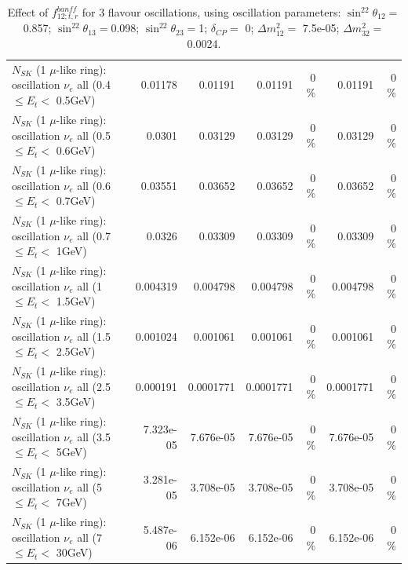 \begin{table}
\begin{tabular}{| l | r | r | r  r | r  r |}
$N_{SK}$ (1 $\mu$-like ring): oscillation $\nu_{e}$ all (0.4 $\leq E_{t} <$ 0.5GeV) &         0.01178 &         0.01191 &         0.01191 &        0 \%  &         0.01191 &        0 \%  \\ 
$N_{SK}$ (1 $\mu$-like ring): oscillation $\nu_{e}$ all (0.5 $\leq E_{t} <$ 0.6GeV) &          0.0301 &         0.03129 &         0.03129 &        0 \%  &         0.03129 &        0 \%  \\ 
$N_{SK}$ (1 $\mu$-like ring): oscillation $\nu_{e}$ all (0.6 $\leq E_{t} <$ 0.7GeV) &         0.03551 &         0.03652 &         0.03652 &        0 \%  &         0.03652 &        0 \%  \\ 
$N_{SK}$ (1 $\mu$-like ring): oscillation $\nu_{e}$ all (0.7 $\leq E_{t} <$ 1GeV) &          0.0326 &         0.03309 &         0.03309 &        0 \%  &         0.03309 &        0 \%  \\ 
$N_{SK}$ (1 $\mu$-like ring): oscillation $\nu_{e}$ all (1 $\leq E_{t} <$ 1.5GeV) &        0.004319 &        0.004798 &        0.004798 &        0 \%  &        0.004798 &        0 \%  \\ 
$N_{SK}$ (1 $\mu$-like ring): oscillation $\nu_{e}$ all (1.5 $\leq E_{t} <$ 2.5GeV) &        0.001024 &        0.001061 &        0.001061 &        0 \%  &        0.001061 &        0 \%  \\ 
$N_{SK}$ (1 $\mu$-like ring): oscillation $\nu_{e}$ all (2.5 $\leq E_{t} <$ 3.5GeV) &        0.000191 &       0.0001771 &       0.0001771 &        0 \%  &       0.0001771 &        0 \%  \\ 
$N_{SK}$ (1 $\mu$-like ring): oscillation $\nu_{e}$ all (3.5 $\leq E_{t} <$ 5GeV) &       7.323e-05 &       7.676e-05 &       7.676e-05 &        0 \%  &       7.676e-05 &        0 \%  \\ 
 $N_{SK}$ (1 $\mu$-like ring): oscillation $\nu_{e}$ all (5 $\leq E_{t} <$ 7GeV) &       3.281e-05 &       3.708e-05 &       3.708e-05 &        0 \%  &       3.708e-05 &        0 \%  \\ 
$N_{SK}$ (1 $\mu$-like ring): oscillation $\nu_{e}$ all (7 $\leq E_{t} <$ 30GeV) &       5.487e-06 &       6.152e-06 &       6.152e-06 &        0 \%  &       6.152e-06 &        0 \%  \\ 
\hline
\hline
\end{tabular}
\caption{ Effect of $f_{12; t, r}^{banff}$ for 3 flavour oscillations, using oscillation parameters:  $\sin^22\theta_{12} = $0.857; $\sin^22\theta_{13} = $0.098; $\sin^22\theta_{23} = $1; $\delta_{CP} = $        0; $\Delta m^2_{12} = $    7.5e-05; $\Delta m^2_{32} = $    0.0024. }
\label{tab:num_banff_12_1RmuT_3f_osc_t13:0.098}
\end{table}
